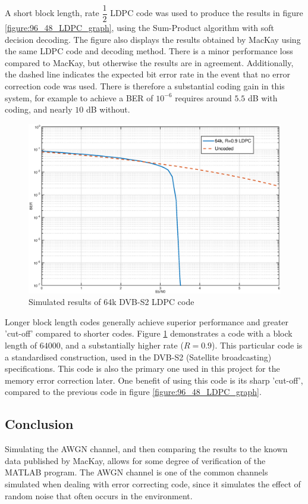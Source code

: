 \documentclass[11pt]{article}
\numberwithin{equation}{subsection}
\begin{document}
A short block length, rate $\dfrac{1}{2}$ LDPC code was used to produce the results in figure \ref{figure:96_48_LDPC_graph}, using the Sum-Product algorithm with soft decision decoding. The figure also displays the results obtained by MacKay using the same LDPC code and decoding method. There is a minor performance loss compared to MacKay, but otherwise the results are in agreement. Additionally, the dashed line indicates the expected bit error rate in the event that no error correction code was used. There is therefore a substantial coding gain in this system, for example to achieve a BER of $10^{-6}$ requires around $5.5$ dB with coding, and nearly $10$ dB without.

\begin{figure}[h]
\centering
\includegraphics[scale=0.6]{dvbs2_graph}
\caption{Simulated results of 64k DVB-S2 LDPC code}
\label{figure:64k_LDPC_graph}
\end{figure}

Longer block length codes generally achieve superior performance and greater 'cut-off' compared to shorter codes. Figure \ref{figure:64k_LDPC_graph} demonstrates a code with a block length of $64000$, and a substantially higher rate ($R=0.9$). This particular code is a standardised construction, used in the DVB-S2 (Satellite broadcasting) specifications. This code is also the primary one used in this project for the memory error correction later. One benefit of using this code is its sharp 'cut-off', compared to the previous code in figure \ref{figure:96_48_LDPC_graph}.

\subsection{Conclusion}
Simulating the AWGN channel, and then comparing the results to the known data published by MacKay, allows for some degree of verification of the MATLAB program. The AWGN channel is one of the common channels simulated when dealing with error correcting code, since it simulates the effect of random noise that often occurs in the environment. 
\end{document}
